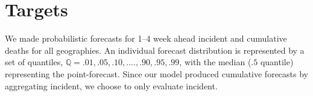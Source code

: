 \documentclass[11pt]{amsart}
\begin{document}
	
	
\section{Targets}	
We made probabilistic forecasts  for 1--4 week ahead incident and cumulative deaths for all geographies. An individual forecast distribution is represented by a set of quantiles, $\mathbb{Q} = {.01,.05,.10,....,.90,.95,.99}$, with the median ($.5$ quantile) representing the point-forecast. Since our model produced cumulative forecasts by aggregating incident, we choose to only evaluate incident. 

\end{document}
